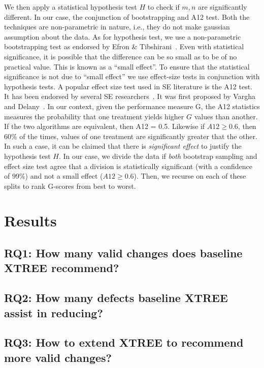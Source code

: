 \documentclass[sigconf, proceedings, 9pt]{acmart}
\begin{document}
We then apply a statistical hypothesis test $H$ to check
if $m,n$ are significantly different. In our case, the conjunction of 
bootstrapping and A12 test. Both the techniques are non-parametric in nature, 
i.e., they do not make gaussian assumption about the data. As for hypothesis 
test, we use a non-parametric bootstrapping test as endorsed by Efron \& 
Tibshirani~\cite[p220-223]{efron93}. Even with statistical significance, it is 
possible that the difference
	can be so small as to be of no practical value. This is known as a ``small 
	effect''. To ensure that the statistical significance is not due to ``small 
	effect'' we use effect-size tests in conjunction with hypothesis tests. A 
	popular effect size test used in SE literature is the A12 test. It has been 
	endorsed by several SE researchers~\cite{leech2002call, poulding10, arcuri11, 
	shepperd12a, kampenes07, Kocaguneli2013:ep}. It was first proposed by Vargha 
	and Delany~\cite{vargha2000}. In our context,
	given the performance measure 
	G, the A12 statistics measures the
	probability that one treatment yields higher $G$ values than another. If the 
	two algorithms are equivalent, then A12 = 0.5. Likewise if $A12 \ge 0.6$, then 
	60\% of the times, values of one treatment are significantly greater that the 
	other. In such a case, it can be claimed that there is \textit{significant 
	effect} to justify the hypothesis test $H$. In our case, we divide the data if 
	\textit{both} bootstrap sampling and effect size test agree that a division is 
	statistically significant (with a
	confidence of 99\%) and not a small effect ($A12 \ge 0.6$). Then, we recurse 
	on each of these splits to rank G-scores from best to worst.




\section{Results}
\label{sect:results}

\subsection*{\textbf{RQ1: How many valid changes does baseline XTREE 
recommend?}}
\subsection*{\textbf{RQ2: How many defects baseline XTREE assist in 
reducing?}}
\subsection*{\textbf{RQ3: How to extend XTREE to recommend more valid 
changes?}} 
\end{document}
